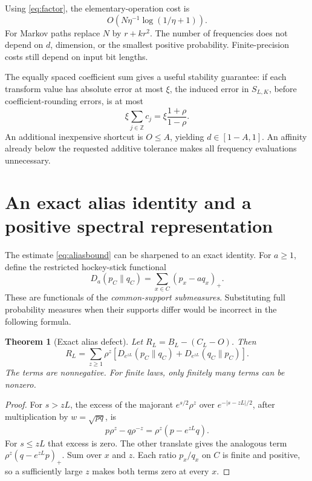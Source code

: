 \documentclass[11pt]{article}
\newtheorem{theorem}{Theorem}[section]
\theoremstyle{definition}
\theoremstyle{remark}
\newcommand{\pos}[1]{\left(#1\right)_{+}}
\newcommand{\Z}{\mathbb Z}
\begin{document}
Using \eqref{eq:factor}, the elementary-operation cost is
\begin{equation}
 O\!\left(N\eta^{-1}\log(1/\eta+1)\right).
 \label{eq:addcost}
\end{equation}
For Markov paths replace $N$ by $r+kr^2$. The number of frequencies does not depend on $d$, dimension, or the smallest positive probability. Finite-precision costs still depend on input bit lengths.

The equally spaced coefficient sum gives a useful stability guarantee: if each transform value has absolute error at most $\xi$, the induced error in $S_{L,K}$, before coefficient-rounding errors, is at most
\[
 \xi\sum_{j\in\Z}c_j=\xi\frac{1+\rho}{1-\rho}.
\]
An additional inexpensive shortcut is $O\le A$, yielding $d\in[1-A,1]$. An affinity already below the requested additive tolerance makes all frequency evaluations unnecessary.

\section{An exact alias identity and a positive spectral representation}
\label{sec:aliasidentity}

The estimate \eqref{eq:aliasbound} can be sharpened to an exact identity. For $a\ge1$, define the restricted hockey-stick functional
\begin{equation}
 D_a(p_C\|q_C)=\sum_{x\in C}\pos{p_x-aq_x}.
 \label{eq:hockey}
\end{equation}
These are functionals of the \emph{common-support submeasures}. Substituting full probability measures when their supports differ would be incorrect in the following formula.

\begin{theorem}[Exact alias defect]
\label{thm:aliasidentity}
Let $R_L=B_L-(C_L-O)$. Then
\begin{equation}
 R_L=\sum_{z\ge1}\rho^z\left[
 D_{e^{zL}}(p_C\|q_C)+D_{e^{zL}}(q_C\|p_C)\right].
 \label{eq:aliasidentity}
\end{equation}
The terms are nonnegative. For finite laws, only finitely many terms can be nonzero.
\end{theorem}
\begin{proof}
For $s>zL$, the excess of the majorant $e^{s/2}\rho^z$ over $e^{-|s-zL|/2}$, after multiplication by $w=\sqrt{pq}$, is
\[
 p\rho^z-q\rho^{-z}=\rho^z(p-e^{zL}q).
\]
For $s\le zL$ that excess is zero. The other translate gives the analogous term $\rho^z(q-e^{zL}p)_+$. Sum over $x$ and $z$. Each ratio $p_x/q_x$ on $C$ is finite and positive, so a sufficiently large $z$ makes both terms zero at every $x$.
\end{proof}
\end{document}
